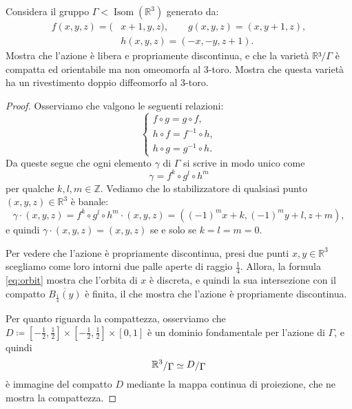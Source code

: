 \documentclass[a4paper]{article}
\newcommand{\R}{\mathbb{R}}
\newcommand{\Z}{\mathbb{Z}}
\newcommand{\ssfrac}[2]{
    \raisebox{+0.3ex}{$#1$}
    /
    \raisebox{-0.3ex}{$#2$}
}
\theoremstyle{definition}
\theoremstyle{definition}
\theoremstyle{remark}
\theoremstyle{definition}
\begin{document}
Considera il gruppo $\Gamma < \operatorname{Isom}(\R^3)$ generato da:
\begin{align*}
    f(x,y,z) = ( & x+1,y,z), \qquad g(x,y,z) = (x,y+1,z), \\
                 & h(x,y,z) = (-x,-y,z+1).
\end{align*}
Mostra che l'azione è libera e propriamente discontinua, e che la varietà $\R³/\Gamma$ è compatta ed orientabile ma non omeomorfa al 3-toro. Mostra che questa varietà ha un
rivestimento doppio diffeomorfo al 3-toro.
\begin{proof}
    Osserviamo che valgono le seguenti relazioni:
    \[
        \begin{cases}
            f \circ g = g\circ f,      \\
            h \circ f = f^{-1}\circ h, \\
            h \circ g = g^{-1}\circ h.
        \end{cases}
    \]
    Da queste segue che ogni elemento $\gamma$ di $\Gamma$ si scrive in modo unico come
    \[
        \gamma = f^{k} \circ g^{l} \circ h^{m}
    \]
    per qualche $k,l,m\in\Z$. Vediamo che lo stabilizzatore di qualsiasi punto $(x,y,z)\in\R^3$ è banale:
    \begin{equation}\label{eq:orbit}
        \gamma \cdot (x,y,z) = f^{k} \circ g^{l} \circ h^{m} \cdot (x,y,z) = ((-1)^m x+k,(-1)^m y+l,z+m),
    \end{equation}
    e quindi $\gamma \cdot (x,y,z) = (x,y,z)$ se e solo se $k=l=m=0$.

    Per vedere che l'azione è propriamente discontinua, presi due punti $x,y\in\R^3$ scegliamo come loro intorni due palle aperte di raggio $\frac{1}{4}$. Allora, la formula
    \eqref{eq:orbit} mostra che l'orbita di $x$ è discreta, e quindi la sua intersezione con il compatto $\overline{B_{\frac{1}{4}}(y)}$ è finita, il che mostra che l'azione è propriamente discontinua.

    Per quanto riguarda la compattezza, osserviamo che $D\coloneqq [-\frac{1}{2},\frac{1}{2}]\times [-\frac{1}{2},\frac{1}{2}]\times[0,1]$ è un dominio fondamentale per l'azione di $\Gamma$, e quindi
    \[
        \ssfrac{\R^3}{\Gamma}\simeq \ssfrac{D}{\Gamma}
    \]
    è immagine del compatto $D$ mediante la mappa continua di proiezione, che ne mostra la compattezza.


\end{proof}
\end{document}
